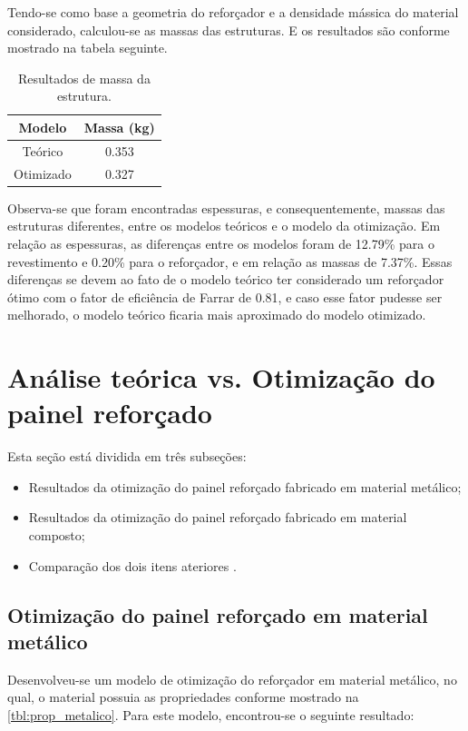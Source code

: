 Tendo-se como base a geometria do reforçador e a densidade mássica do material considerado, calculou-se as massas das estruturas. E os resultados são conforme mostrado na tabela seguinte.

\begin{table}[h]
\centering
\begin{tabular}{cc}
\toprule
Modelo & Massa (kg) \\ \midrule
Teórico & 0.353\\
Otimizado & 0.327\\
\bottomrule
\end{tabular}
\caption{Resultados de massa da estrutura.}
\label{tbl:result2_metalico}
\end{table}

Observa-se que foram encontradas espessuras, e consequentemente, massas das estruturas diferentes, entre os modelos teóricos e o modelo da otimização.
Em relação as espessuras, as diferenças entre os modelos foram de 12.79\% para o revestimento e 0.20\% para o reforçador, e em relação as massas de 7.37\%. Essas diferenças se devem ao fato de o modelo teórico ter considerado um reforçador ótimo com o fator de eficiência de Farrar de 0.81, e caso esse fator pudesse ser melhorado, o modelo teórico ficaria mais aproximado do modelo otimizado.

\section{Análise teórica vs. Otimização do painel reforçado}
Esta seção está dividida em três subseções:
\begin{itemize}
\item Resultados da otimização do painel reforçado fabricado em material metálico;
\item Resultados da otimização do painel reforçado fabricado em material composto;
\item Comparação dos dois itens ateriores .
\end{itemize}

\subsection{Otimização do painel reforçado em material metálico}
Desenvolveu-se um modelo de otimização do reforçador em material metálico, no qual, o material possuia as propriedades conforme mostrado na \autoref{tbl:prop_metalico}. Para este modelo, encontrou-se o seguinte resultado:\

